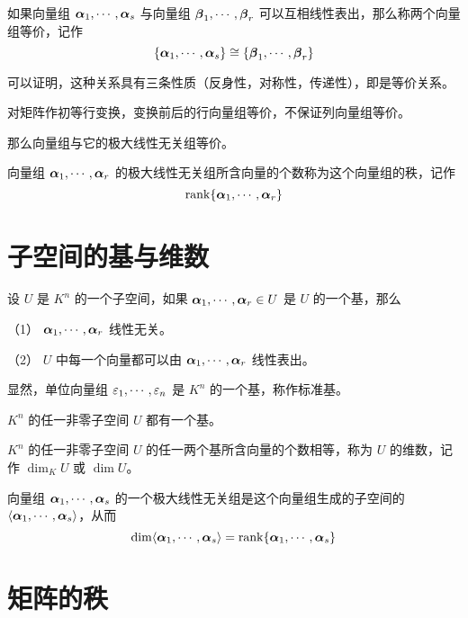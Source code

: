 \begin{definition}
	如果向量组 $\boldsymbol{\alpha}_1,\cdots,\boldsymbol{\alpha}_s$ 与向量组 $\boldsymbol{\beta}_1,\cdots,\boldsymbol{\beta}_r$ 可以互相线性表出，那么称两个向量组等价，记作
	\[\{\boldsymbol{\alpha}_1,\cdots,\boldsymbol{\alpha}_s\} \cong \{\boldsymbol{\beta}_1,\cdots,\boldsymbol{\beta}_r\}\]
\end{definition}

可以证明，这种关系具有三条性质（反身性，对称性，传递性），即是等价关系。

对矩阵作初等行变换，变换前后的行向量组等价，不保证列向量组等价。

那么向量组与它的极大线性无关组等价。

\begin{definition}
	向量组 $\boldsymbol{\alpha}_1,\cdots,\boldsymbol{\alpha}_r$ 的极大线性无关组所含向量的个数称为这个向量组的秩，记作
	\[\operatorname{rank}\{\boldsymbol{\alpha}_1,\cdots,\boldsymbol{\alpha}_r\}\]
\end{definition}

\section{子空间的基与维数}

\begin{definition}[子空间]
	设 $U$ 是 $K^n$ 的一个子空间，如果 $\boldsymbol{\alpha}_1,\cdots,\boldsymbol{\alpha}_r\in U$ 是 $U$ 的一个基，那么

	（1） $\boldsymbol{\alpha}_1,\cdots,\boldsymbol{\alpha}_r$ 线性无关。

	（2） $U$ 中每一个向量都可以由 $\boldsymbol{\alpha}_1,\cdots,\boldsymbol{\alpha}_r$ 线性表出。
\end{definition}

显然，单位向量组 $\varepsilon_1,\cdots,\varepsilon_n$ 是 $K^n$ 的一个基，称作标准基。

\begin{theorem}
	$K^n$ 的任一非零子空间 $U$ 都有一个基。
\end{theorem}

\begin{theorem}
	$K^n$ 的任一非零子空间 $U$ 的任一两个基所含向量的个数相等，称为 $U$ 的维数，记作 $\dim_KU$ 或 $\dim U$。
\end{theorem}

\begin{theorem}
	向量组 $\boldsymbol{\alpha}_1,\cdots,\boldsymbol{\alpha}_s$ 的一个极大线性无关组是这个向量组生成的子空间的 $\langle \boldsymbol{\alpha}_1,\cdots,\boldsymbol{\alpha}_s \rangle$，从而
	\[\dim\langle \boldsymbol{\alpha}_1,\cdots,\boldsymbol{\alpha}_s \rangle = \operatorname{rank}\{\boldsymbol{\alpha}_1,\cdots,\boldsymbol{\alpha}_s\}\]
\end{theorem}

\section{矩阵的秩}


